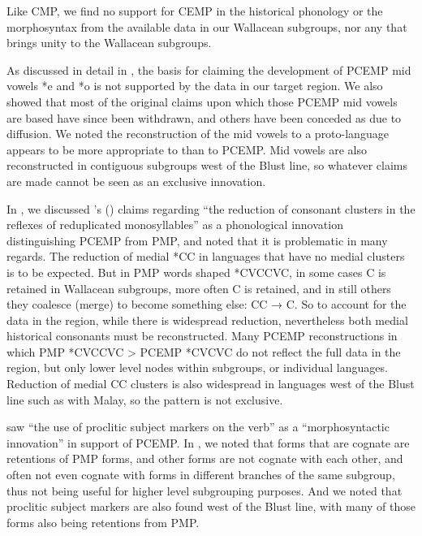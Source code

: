 Like CMP,
we find no support for CEMP in the historical phonology or the
morphosyntax from the available data in our Wallacean subgroups,
nor any that brings unity to the Wallacean subgroups.

As discussed in detail in ,
the basis for claiming the development of PCEMP mid vowels *e
and *o is not supported by the data in our target region.
We also showed that most of the original claims upon which those
PCEMP mid vowels are based have since been withdrawn,
and others have been conceded as due to diffusion.
We noted the reconstruction of the mid vowels to a proto-language
appears to be more appropriate to  than to PCEMP.
Mid vowels are also reconstructed in contiguous subgroups west
of the Blust line,
so whatever claims are made cannot be seen as an exclusive innovation.

In , we discussed \citeauthor{Blust1993}’s
(\citeyear[246]{Blust1993}) claims regarding
“the reduction of consonant clusters in the reflexes of reduplicated
monosyllables” as a phonological innovation distinguishing PCEMP
from PMP, and noted that it is problematic in many regards.
The reduction of medial *CC in languages that have no medial
clusters is to be expected.
But in PMP words shaped *CVCCVC,
in some cases C is retained in Wallacean subgroups,
more often C is retained,
and in still others they coalesce (merge) to become something
else: CC  → C.
So to account for the data in the region,
while there is widespread reduction,
nevertheless both medial historical consonants must be reconstructed.
Many PCEMP reconstructions in which PMP *CVCCVC > PCEMP *CVCVC
do not reflect the full data in the region,
but only lower level nodes within subgroups, or individual languages.
Reduction of medial CC clusters is also widespread in languages
west of the Blust line such as with Malay,
so the pattern is not exclusive.

\citet[258]{Blust1993} saw “the use of proclitic subject markers
on the verb” as a “morphosyntactic innovation” in support of PCEMP.
In , we noted that forms that are cognate are retentions
of PMP forms, and other forms are not cognate with each other,
and often not even cognate with forms in different branches of
the same subgroup, thus not being useful for higher level subgrouping purposes.
And we noted that proclitic subject markers are also found west
of the Blust line,
with many of those forms also being retentions from PMP.

